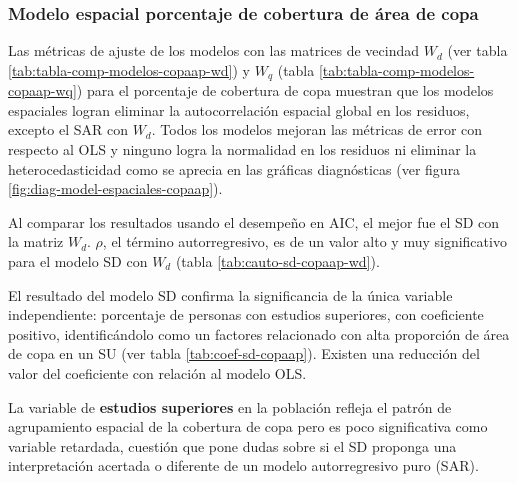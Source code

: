 \documentclass[12pt,a4paper,oneside, openany]{book}
\theoremstyle{definition}
\theoremstyle{definition}
\theoremstyle{definition}
\theoremstyle{remark}
\begin{document}
\subsubsection{Modelo espacial porcentaje de cobertura de área de
copa}\label{modelo-espacial-porcentaje-de-cobertura-de-uxe1rea-de-copa}

Las métricas de ajuste de los modelos con las matrices de vecindad
\(W_d\) (ver tabla \ref{tab:tabla-comp-modelos-copaap-wd}) y \(W_q\)
(tabla \ref{tab:tabla-comp-modelos-copaap-wq}) para el porcentaje de
cobertura de copa muestran que los modelos espaciales logran eliminar la
autocorrelación espacial global en los residuos, excepto el SAR con
\(W_d\). Todos los modelos mejoran las métricas de error con respecto al
OLS y ninguno logra la normalidad en los residuos ni eliminar la
heterocedasticidad como se aprecia en las gráficas diagnósticas (ver
figura \ref{fig:diag-model-espaciales-copaap}).

Al comparar los resultados usando el desempeño en AIC, el mejor fue el
SD con la matriz \(W_d\). \(\rho\), el término autorregresivo, es de un
valor alto y muy significativo para el modelo SD con \(W_d\) (tabla
\ref{tab:cauto-sd-copaap-wd}).

El resultado del modelo SD confirma la significancia de la única
variable independiente: porcentaje de personas con estudios superiores,
con coeficiente positivo, identificándolo como un factores relacionado
con alta proporción de área de copa en un SU (ver tabla
\ref{tab:coef-sd-copaap}). Existen una reducción del valor del
coeficiente con relación al modelo OLS.

La variable de \textbf{estudios superiores} en la población refleja el
patrón de agrupamiento espacial de la cobertura de copa pero es poco
significativa como variable retardada, cuestión que pone dudas sobre si
el SD proponga una interpretación acertada o diferente de un modelo
autorregresivo puro (SAR).
\end{document}
